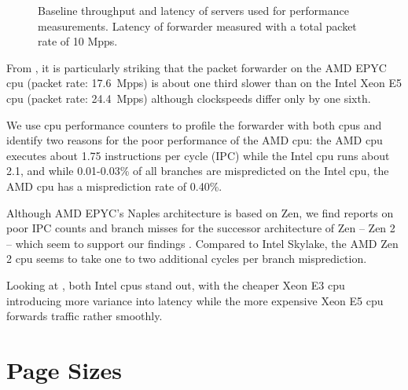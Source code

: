 \begin{figure}%
	\centering

    \caption{Baseline throughput and latency of servers used for performance
    measurements. Latency of forwarder measured with a total packet rate of 10
    Mpps.}
	\label{fig:baseline-perf}
\end{figure}

From , it is particularly striking that the
packet forwarder on the AMD EPYC \ac{cpu} (packet rate: 17.6~Mpps) is about one
third slower than on the Intel Xeon E5 \ac{cpu} (packet rate: 24.4~Mpps)
although clockspeeds differ only by one sixth.

We use \ac{cpu} performance counters to profile the forwarder with both
\acp{cpu} and identify two reasons for the poor performance of the AMD \ac{cpu}:
the AMD \ac{cpu} executes about 1.75 instructions per cycle (IPC) while the
Intel \ac{cpu} runs about 2.1, and while 0.01-0.03\% of all branches are
mispredicted on the Intel \ac{cpu}, the AMD \ac{cpu} has a misprediction rate of
0.40\%.

Although AMD EPYC's Naples architecture is based on Zen, we find reports on poor
IPC counts and branch misses for the successor architecture of Zen -- Zen 2 --
which seem to support our findings \cite{lemire2019instructions,
lemire2019mispredictions}. Compared to Intel Skylake, the AMD Zen 2 \ac{cpu}
seems to take one to two additional cycles per branch misprediction.

Looking at , both Intel \acp{cpu} stand out,
with the cheaper Xeon E3 \ac{cpu} introducing more variance into latency while
the more expensive Xeon E5 \ac{cpu} forwards traffic rather smoothly.


\section{Page Sizes}
\label{sec:page_sizes}

